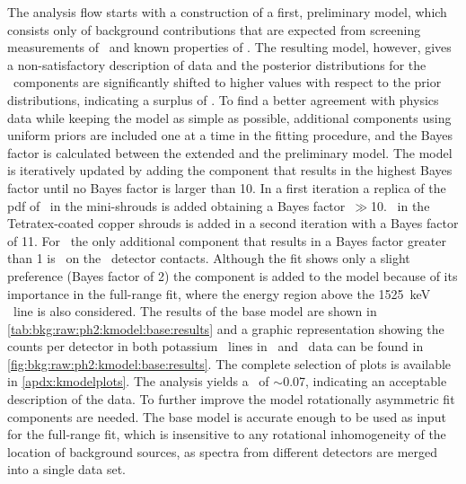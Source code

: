 The analysis flow starts with a construction of a first, preliminary model, which consists
only of background contributions that are expected from screening measurements of \kvn\
and known properties of \kvz.  The resulting model, however, gives a non-satisfactory
description of data and the posterior distributions for the \kvn\ components are
significantly shifted to higher values with respect to the prior distributions, indicating
a surplus of \kvn.  To find a better agreement with physics data while keeping the model
as simple as possible, additional components using uniform priors are included one at a
time in the fitting procedure, and the Bayes factor is calculated between the extended and
the preliminary model. The model is iteratively updated by adding the component that
results in the highest Bayes factor until no Bayes factor is larger than 10.
\newpar
In a first iteration a replica of the pdf of \kvn\ in the mini-shrouds is added obtaining
a Bayes factor~$\gg$10. \kvn\ in the Tetratex\reg-coated copper shrouds is added in a
second iteration with a Bayes factor of 11.  For \kvz\ the only additional component that
results in a Bayes factor greater than 1 is \kvz\ on the \nplus\ detector contacts.
Although the fit shows only a slight preference (Bayes factor of 2) the component is added
to the model because of its importance in the full-range fit, where the energy region
above the 1525~keV \g\ line is also considered.  The results of the base model are shown
in \cref{tab:bkg:raw:ph2:kmodel:base:results} and a graphic representation showing the
counts per detector in both potassium \g\ lines in \Mone\ and \Mtwo\ data can be found in
\cref{fig:bkg:raw:ph2:kmodel:base:results}. The complete selection of plots is available
in \cref{apdx:kmodelplots}.  The analysis yields a \pvalue\ of $\sim$0.07, indicating an
acceptable description of the data. To further improve the model rotationally asymmetric
fit components are needed. The base model is accurate enough to be used as input for the
full-range fit, which is insensitive to any rotational inhomogeneity of the location of
background sources, as spectra from different detectors are merged into a single data set.

